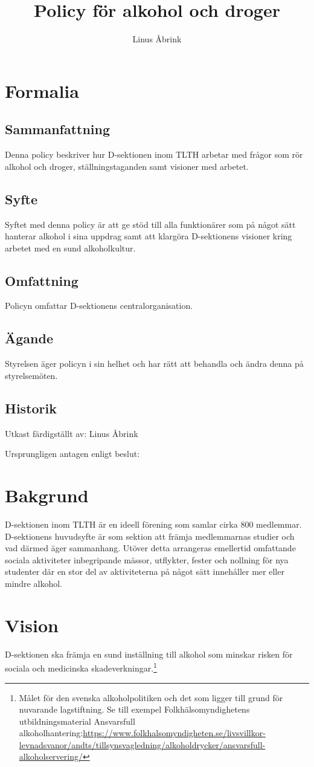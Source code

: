 \documentclass[]{dsekkallelse}
\title{Policy för alkohol och droger}
\author{Linus Åbrink}
\begin{document}
\section{Formalia}

\subsection{Sammanfattning}
Denna policy beskriver hur D-sektionen inom TLTH arbetar med frågor som rör alkohol och droger, ställningstaganden samt visioner med arbetet.

\subsection{Syfte}
Syftet med denna policy är att ge stöd till alla funktionärer som på något sätt hanterar alkohol
i sina uppdrag samt att klargöra D-sektionens visioner kring arbetet med en sund alkoholkultur.

\subsection{Omfattning}
Policyn omfattar D-sektionens centralorganisation.

\subsection{Ägande}
Styrelsen äger policyn i sin helhet och har rätt att behandla och ändra denna på styrelsemöten.

\subsection{Historik}
Utkast färdigställt av: Linus Åbrink

Ursprungligen antagen enligt beslut:


\section{Bakgrund}
D-sektionen inom TLTH är en ideell förening som samlar cirka 800 medlemmar. D-sektionens huvudsyfte är som sektion att främja medlemmarnas studier och vad därmed äger sammanhang. Utöver detta arrangeras emellertid omfattande sociala aktiviteter inbegripande mässor, utflykter, fester och nollning för nya studenter där en stor del av aktiviteterna på något sätt innehåller mer eller mindre alkohol.

\section{Vision}
D-sektionen ska främja en sund inställning till alkohol som minskar risken för sociala och
medicinska skadeverkningar.\footnote{Målet för den svenska alkoholpolitiken och det som ligger till grund för nuvarande lagstiftning. Se till exempel Folkhälsomyndighetens utbildningsmaterial Ansvarsfull alkoholhantering:\url{https://www.folkhalsomyndigheten.se/livsvillkor-levnadsvanor/andts/tillsynsvagledning/alkoholdrycker/ansvarsfull-alkoholservering/}
}
\end{document}
